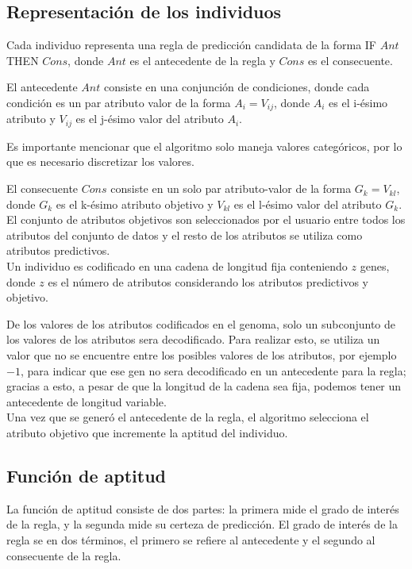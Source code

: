 \subsection{Representación de los individuos}

Cada individuo representa una regla de predicción candidata de la forma IF $Ant$ THEN $Cons$, donde $Ant$ es el antecedente de la regla y $Cons$ es el consecuente.

El antecedente $Ant$ consiste en una conjunción de condiciones, donde cada condición es un par atributo valor de la forma $A_i = V_{ij}$, donde $A_i$ es el i-ésimo atributo y $V_{ij}$ es el j-ésimo valor del atributo $A_i$.

Es importante mencionar que el algoritmo solo maneja valores categóricos, por lo que es necesario discretizar los valores.

El consecuente $Cons$ consiste en un solo par atributo-valor de la forma $G_k = V_{kl}$, donde $G_k$ es el k-ésimo atributo objetivo y $V_{kl}$ es el l-ésimo valor del atributo $G_k$. El conjunto de atributos objetivos son seleccionados por el usuario entre todos los atributos del conjunto de datos y el resto de los atributos se utiliza como atributos predictivos.
\\
Un individuo es codificado en una cadena de longitud fija conteniendo $z$ genes, donde $z$ es el número de atributos considerando los atributos predictivos y objetivo.

De los valores de los atributos codificados en el genoma, solo un subconjunto de los valores de los atributos sera decodificado. Para realizar esto, se utiliza un valor que no se encuentre entre los posibles valores de los atributos, por ejemplo $-1$, para indicar que ese gen no sera decodificado en un antecedente para la regla; gracias a esto, a pesar de que la longitud de la cadena sea fija, podemos tener un antecedente de longitud variable.
\\
Una vez que se generó el antecedente de la regla, el algoritmo selecciona el atributo objetivo que incremente la aptitud del individuo.

\subsection{Función de aptitud}

La función de aptitud consiste de dos partes: la primera mide el grado de interés de la regla, y la segunda mide su certeza de predicción. El grado de interés de la regla se en dos términos, el primero se refiere al antecedente y el segundo al consecuente de la regla.

